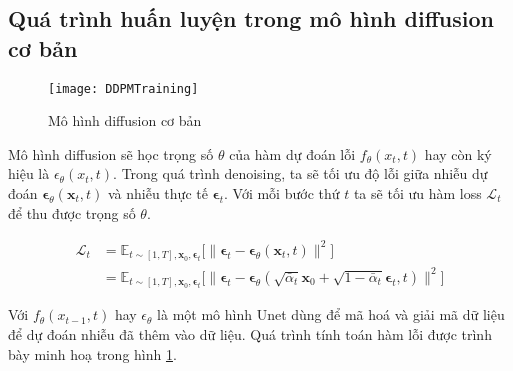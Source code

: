 	
	\subsection{Quá trình huấn luyện trong mô hình diffusion cơ bản}
	
	\begin{figure}
		\centering
		\texttt{[image: DDPMTraining]}
		\caption{Mô hình diffusion cơ bản}
		\label{fig:basic_diffusion}
	\end{figure}
	
	Mô hình diffusion sẽ học trọng số $\theta$ của hàm dự đoán lỗi $f_{\theta} (x_t, t)$ hay còn ký hiệu là  $\epsilon_{\theta} (x_t, t)$. Trong quá trình denoising, ta sẽ tối ưu độ lỗi giữa nhiễu dự đoán $\boldsymbol{\epsilon}_\theta(\mathbf{x}_t, t)$ và nhiễu thực tế $\boldsymbol{\epsilon}_t$. Với mỗi bước thứ $t$ ta sẽ tối ưu hàm loss $\mathcal{L}_{t}$ để thu được trọng số $\theta$.
	
	\begin{equation}
		\label{eq:diffusion_loss}
		\begin{aligned}
			\mathcal{L}_t
			&= \mathbb{E}_{t \sim [1, T], \mathbf{x}_0, \boldsymbol{\epsilon}_t} \Big[\|\boldsymbol{\epsilon}_t - \boldsymbol{\epsilon}_\theta(\mathbf{x}_t, t)\|^2 \Big] \\
			&= \mathbb{E}_{t \sim [1, T], \mathbf{x}_0, \boldsymbol{\epsilon}_t} \Big[\|\boldsymbol{\epsilon}_t - \boldsymbol{\epsilon}_\theta(\sqrt{\bar{\alpha}_t}\mathbf{x}_0 + \sqrt{1 - \bar{\alpha}_t}\boldsymbol{\epsilon}_t, t)\|^2 \Big]
		\end{aligned}
	\end{equation}
	
	
Với $f_{\theta}(x_{t-1}, t)$ hay $\epsilon_\theta$ là một mô hình Unet dùng để mã hoá và giải mã dữ liệu để dự đoán nhiễu đã thêm vào dữ liệu. Quá trình tính toán hàm lỗi được trình bày minh hoạ trong hình \ref{fig:basic_diffusion}.

